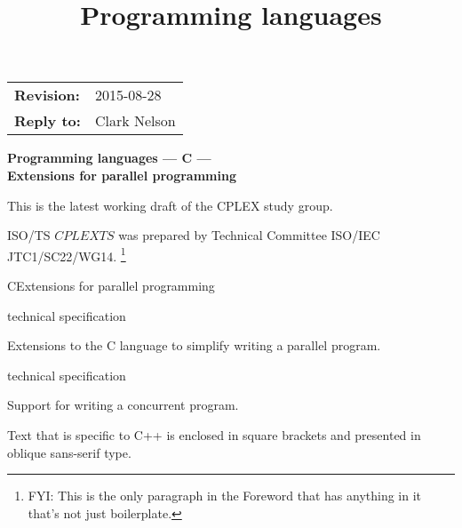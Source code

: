 \documentclass[
	techspec,	%
	final,		%
	notcopyright,	%
	letterpaper	%
	]{isov2}
\newcommand{\cplexts}{$CPLEXTS$}
\renewcommand{\extrahead}{2015-08-28}
\begin{document}
\begin{cover}
\begin{tabular}{l l}
\textbf{Revision:} & \extrahead \\
\textbf{Reply to:} & Clark Nelson
\end{tabular}

{\Huge
\bfseries
Programming languages --- C --- \\
Extensions for parallel programming
}

This is the latest working draft of the CPLEX study group.
\clearpage
\end{cover}


\begin{foreword}


ISO/TS
\cplexts{}
was prepared by Technical Committee ISO/IEC JTC1/SC22/WG14.%
\footnote{FYI:
This is the only paragraph in the Foreword that has anything in it
that's not just boilerplate.
}

\fwdnopatents
\end{foreword}

\begin{introduction}
\intropatents
\end{introduction}

\title{Programming languages}{C}{Extensions for parallel programming}

\scopeclause
\begin{inscope}{technical specification}
\item
Extensions to the C language to simplify writing a parallel program.
\end{inscope}
\begin{outofscope}{technical specification}
\item
Support for writing a concurrent program.
\end{outofscope}

\normrefsclause
{}
\begin{nreferences}
\end{nreferences}




\pnum
\begin{cpp}
Text that is specific to C++
is enclosed in square brackets
and presented in oblique sans-serif type.
\end{cpp}
\end{document}
